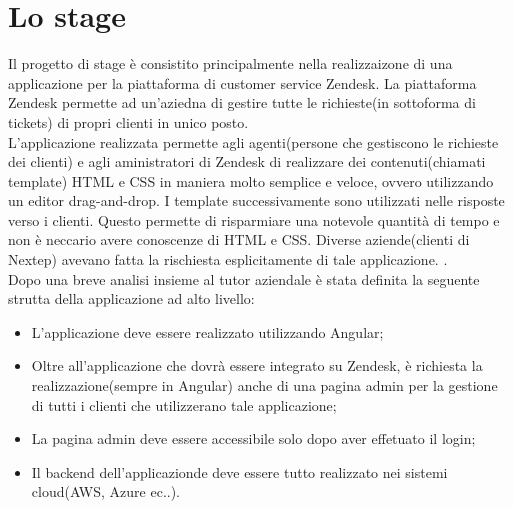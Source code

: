 \section{Lo stage}
Il progetto di stage è consistito principalmente nella realizzaizone di una applicazione per la piattaforma di customer service Zendesk. La piattaforma Zendesk permette ad un'aziedna di gestire tutte le richieste(in sottoforma di tickets) di propri clienti in unico posto. \\ L'applicazione realizzata permette agli agenti(persone che gestiscono le richieste dei clienti) e agli aministratori di Zendesk di realizzare dei contenuti(chiamati template) HTML e CSS in maniera molto semplice e veloce, ovvero utilizzando un editor drag-and-drop. I template successivamente sono utilizzati nelle risposte verso i clienti. Questo permette di risparmiare una notevole quantità di tempo e non è neccario avere conoscenze di HTML e CSS. Diverse aziende(clienti di Nextep) avevano fatta la rischiesta esplicitamente di tale applicazione. .
\\

Dopo una breve analisi insieme al tutor aziendale è stata definita la seguente strutta della applicazione ad alto livello: 
\begin{itemize}
	\item L'applicazione deve essere realizzato utilizzando Angular; 
	\item Oltre all'applicazione che dovrà essere integrato su Zendesk, è richiesta la realizzazione(sempre in Angular) anche di una pagina admin per la gestione di tutti i clienti che utilizzerano tale applicazione;
	\item La pagina admin deve essere accessibile solo dopo aver effetuato il login;
	\item Il backend dell'applicazionde deve essere tutto realizzato nei sistemi cloud(AWS, Azure ec..).
\end{itemize} 